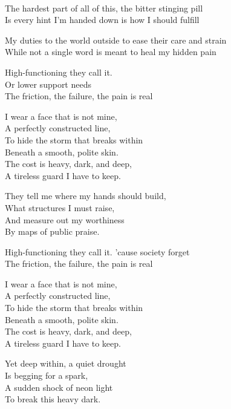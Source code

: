\begin{lyrics}


\\
The hardest part of all of this, the bitter stinging pill \\
Is every hint I'm handed down is how I should fulfill

My duties to the world outside to ease their care and strain \\
While not a single word is meant to heal my hidden pain

High-functioning they call it.\\ 
Or lower support needs\\
The friction, the failure, the pain is real

I wear a face that is not mine,\\
A perfectly constructed line,\\
To hide the storm that breaks within\\
Beneath a smooth, polite skin.\\
The cost is heavy, dark, and deep,\\
A tireless guard I have to keep.

They tell me where my hands should build,\\
What structures I must raise,\\
And measure out my worthiness\\
By maps of public praise.

High-functioning they call it. 
'cause society forget\\
The friction, the failure, the pain is real

I wear a face that is not mine,\\
A perfectly constructed line,\\
To hide the storm that breaks within\\
Beneath a smooth, polite skin.\\
The cost is heavy, dark, and deep,\\
A tireless guard I have to keep.

Yet deep within, a quiet drought\\
Is begging for a spark,\\
A sudden shock of neon light\\
To break this heavy dark.


\end{lyrics}
